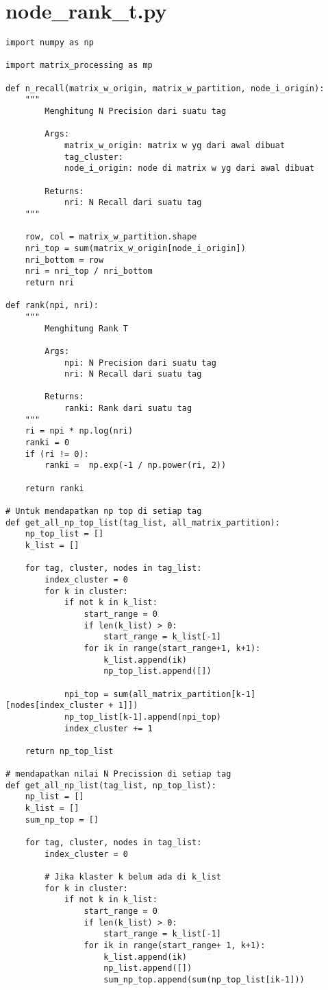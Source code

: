 \chapter{node\_rank\_t.py}
\begin{lstlisting}[breaklines=true]
import numpy as np

import matrix_processing as mp

def n_recall(matrix_w_origin, matrix_w_partition, node_i_origin):
	"""
		Menghitung N Precision dari suatu tag

		Args:
			matrix_w_origin: matrix w yg dari awal dibuat
			tag_cluster: 
			node_i_origin: node di matrix w yg dari awal dibuat

		Returns:
			nri: N Recall dari suatu tag
	"""
	
	row, col = matrix_w_partition.shape
	nri_top = sum(matrix_w_origin[node_i_origin]) 
	nri_bottom = row
	nri = nri_top / nri_bottom
	return nri

def rank(npi, nri):
	"""
		Menghitung Rank T

		Args:
			npi: N Precision dari suatu tag
			nri: N Recall dari suatu tag

		Returns:
			ranki: Rank dari suatu tag
	"""
	ri = npi * np.log(nri)
	ranki = 0
	if (ri != 0):
		ranki =  np.exp(-1 / np.power(ri, 2))
	
	return ranki

# Untuk mendapatkan np top di setiap tag
def get_all_np_top_list(tag_list, all_matrix_partition):
	np_top_list = []
	k_list = []
	
	for tag, cluster, nodes in tag_list:
		index_cluster = 0
		for k in cluster:
			if not k in k_list:
				start_range = 0
				if len(k_list) > 0:
					start_range = k_list[-1]
				for ik in range(start_range+1, k+1):
					k_list.append(ik)
					np_top_list.append([])
			
			npi_top = sum(all_matrix_partition[k-1][nodes[index_cluster + 1]])
			np_top_list[k-1].append(npi_top)
			index_cluster += 1
	
	return np_top_list

# mendapatkan nilai N Precission di setiap tag
def get_all_np_list(tag_list, np_top_list):
	np_list = []
	k_list = []
	sum_np_top = []
	
	for tag, cluster, nodes in tag_list:
		index_cluster = 0
			
		# Jika klaster k belum ada di k_list
		for k in cluster:
			if not k in k_list:
				start_range = 0
				if len(k_list) > 0:
					start_range = k_list[-1]
				for ik in range(start_range+ 1, k+1):
					k_list.append(ik)
					np_list.append([])
					sum_np_top.append(sum(np_top_list[ik-1]))
		

\end{lstlisting}
